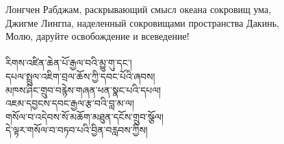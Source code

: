 Лонгчен Рабджам, раскрывающий смысл океана сокровищ ума,\\
Джигме Лингпа, наделенный сокровищами пространства Дакинь,\\
Молю, даруйте освобождение и всеведение!\\
\\
\ti
རིགས་འཛིན་ཆེན་པོ་རྒྱལ་བའི་མྱུ་གུ་དང་།\\
དཔལ་སྤྲུལ་འཇིག་བྲལ་ཆོས་ཀྱི་དབང་པོའི་ཞབས།\\
མཁས་ཤིང་གྲུབ་བརྙེས་གཞན་ཕན་སྣང་པའི་དཔལ།\\
འཇམ་དབྱངས་དབང་རྒྱལ་རྩ་བའི་བླ་མ་ལ།\\
གསོལ་བ་འདེབས་སོ་མཆོག་མཐུན་དངོས་གྲུབ་སྩོལ།\\
དེ་ལྟར་གསོལ་བ་བཏབ་པའི་བྱིན་བརླབས་ཀྱིས།\\
